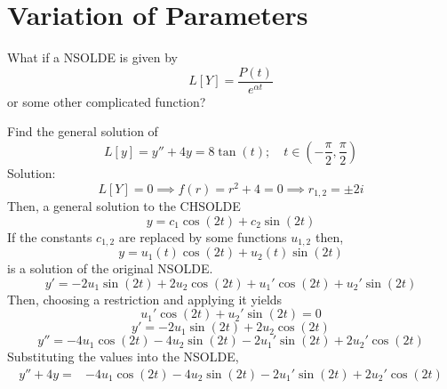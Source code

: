 \documentclass[diffeq.tex]{subfiles}
\begin{document}
    \section{Variation of Parameters}
    What if a NSOLDE is given by
    \begin{equation}
        L[Y] = \frac{P(t)}{e^{\alpha t}}
    \end{equation}
    or some other complicated function?
    \begin{example}
        Find the general solution of
        \begin{equation}
            L[y] = y'' + 4y = 8\tan(t);\quad t\in\left(-\frac{\pi}{2}, \frac{\pi}{2}\right)
        \end{equation}
        Solution:
        \begin{equation}
            L[Y] = 0 \implies f(r) = r^{2} + 4 = 0 \implies r_{1,2} = \pm 2i
        \end{equation}
        Then, a general solution to the CHSOLDE
        \begin{equation}
            y = c_{1}\cos(2t) + c_{2}\sin(2t)
        \end{equation}
        If the constants $c_{1,2}$ are replaced by some functions $u_{1,2}$ then,
        \begin{equation}
            y = u_{1}(t)\cos(2t) + u_{2}(t)\sin(2t)
        \end{equation}
        is a solution of the original NSOLDE.
        \begin{equation}
            y' = -2u_{1}\sin(2t) + 2u_{2}\cos(2t)+u_{1}'\cos(2t)+u_{2}'\sin(2t)
        \end{equation}
        Then, choosing a restriction and applying it yields
        \begin{equation}
            u_{1}'\cos(2t) + u_{2}'\sin(2t) = 0
        \end{equation}
        \begin{equation}
            y' = -2u_{1}\sin(2t) + 2u_{2}\cos(2t)
        \end{equation}
        \begin{equation}
            y'' = -4u_{1}\cos(2t)-4u_{2}\sin(2t)-2u_{1}'\sin(2t)+2u_{2}'\cos(2t)
        \end{equation}
        Substituting the values into the NSOLDE,
        \begin{equation}
            \begin{alignedat}{1}
                y'' + 4y = &-4u_{1}\cos(2t) - 4u_{2}\sin(2t)-2u_{1}'\sin(2t)+2u_{2}'\cos(2t)\\

\end{alignedat}
\end{equation}
\end{example}
\end{document}

